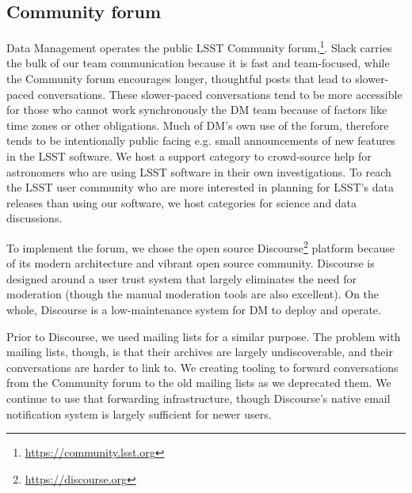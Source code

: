 \subsection{Community forum}
\label{sec:forum}

Data Management operates the public LSST Community forum,\footnote{\url{https://community.lsst.org}}.
Slack carries the bulk of our team communication because it is fast and team-focused, while
the Community forum  encourages longer, thoughtful posts that lead to slower-paced conversations.
These slower-paced conversations tend to be more accessible for those who cannot work synchronously the DM team because of factors like time zones or other obligations.
Much of DM's own use of the forum, therefore tends to be intentionally public facing e.g.
small announcements of new features in the LSST software.
We host a support category to crowd-source help for astronomers who are using LSST software in their own investigations.
To reach the LSST user community who are more interested in planning for LSST's data releases than using our software, we host categories for science and data discussions.

To implement the forum, we chose the open source Discourse\footnote{\url{https://discourse.org}} platform because of its modern architecture and vibrant open source community.
Discourse is designed around a user trust system that largely eliminates the need for moderation (though the manual moderation tools are also excellent).
On the whole, Discourse is a low-maintenance system for DM to deploy and operate.

Prior to Discourse, we used mailing lists for a similar purpose.
The problem with mailing lists, though, is that their archives are largely undiscoverable, and their conversations are harder to link to.
We creating tooling to forward conversations from the Community forum to the old mailing lists as we deprecated them.
We continue to use that forwarding infrastructure, though Discourse's native email notification system is largely sufficient for newer users.

